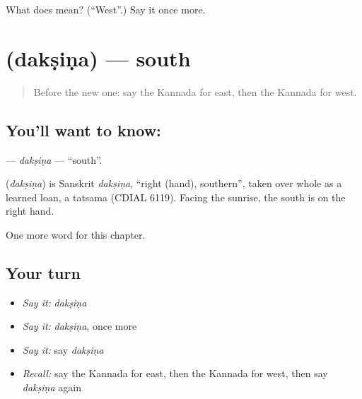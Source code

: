 \begin{tcolorbox}[breakable,colback=teal!4,colframe=teal!35!black,title={Before you move on}]
What does  mean? (\textquotedblleft{}West\textquotedblright{}.) Say it once more.
\end{tcolorbox}
\section[\texorpdfstring{\kn{ದಕ್ಷಿಣ} (dakṣiṇa)}{ದಕ್ಷಿಣ (dakṣiṇa)}]{ (dakṣiṇa) — south}

\label{lesson:KA-C249-daksina}



\begin{quote}
Before the new one: say the Kannada for east, then the Kannada for west.
\end{quote}

\subsection*{You'll want to know: }
\textbf{} — \emph{dakṣiṇa} — \textquotedblleft{}south\textquotedblright{}.

\begin{cousinweb}
\textbf{} (\emph{dakṣiṇa}) is Sanskrit \emph{dakṣiṇa}, \textquotedblleft{}right (hand), southern\textquotedblright{}, taken over whole as a learned loan, a tatsama (CDIAL 6119). Facing the sunrise, the south is on the right hand.
\end{cousinweb}

\begin{grammarlens}[title={What you've built}]
One more word for this chapter.
\end{grammarlens}

\subsection*{Your turn}
\begin{itemize}
\raggedright
  \item \emph{Say it:} \emph{dakṣiṇa}
  \item \emph{Say it:} \emph{dakṣiṇa}, once more
  \item \emph{Say it:} say \emph{dakṣiṇa}
  \item \emph{Recall:} say the Kannada for east, then the Kannada for west, then say \emph{dakṣiṇa} again
\end{itemize}

